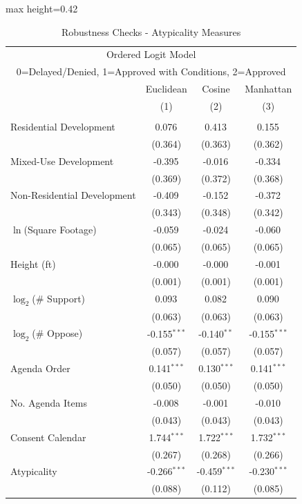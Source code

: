 \begin{table}[H]
\centering
\caption{Robustness Checks - Atypicality Measures}
\vspace{0.2cm}
\label{tab_atypicality_robustness}
\begin{adjustbox}{max height=0.42\textheight}
\begin{threeparttable}
\begin{tabular}{lccc}
\multicolumn{4}{c}{Ordered Logit Model} \\
\multicolumn{4}{c}{0=Delayed/Denied, 1=Approved with Conditions, 2=Approved} \\
\toprule
 & Euclidean & Cosine & Manhattan  \\
 & (1) & (2) & (3) \\
\midrule
 &  &  &  \\
Residential Development  & 0.076$^{}$ & 0.413$^{}$ & 0.155$^{}$ \\
 & (0.364) & (0.363) & (0.362) \\ [1.8ex]
Mixed-Use Development  & -0.395$^{}$ & -0.016$^{}$ & -0.334$^{}$ \\
 & (0.369) & (0.372) & (0.368) \\ [1.8ex]
Non-Residential Development  & -0.409$^{}$ & -0.152$^{}$ & -0.372$^{}$ \\
 & (0.343) & (0.348) & (0.342) \\ [1.8ex]
$\ln$(Square Footage)  & -0.059$^{}$ & -0.024$^{}$ & -0.060$^{}$ \\
 & (0.065) & (0.065) & (0.065) \\ [1.8ex]
Height (ft)  & -0.000$^{}$ & -0.000$^{}$ & -0.001$^{}$ \\
 & (0.001) & (0.001) & (0.001) \\ [1.8ex]
$\log_2$(\# Support)  & 0.093$^{}$ & 0.082$^{}$ & 0.090$^{}$ \\
 & (0.063) & (0.063) & (0.063) \\ [1.8ex]
$\log_2$(\# Oppose)  & -0.155$^{***}$ & -0.140$^{**}$ & -0.155$^{***}$ \\
 & (0.057) & (0.057) & (0.057) \\ [1.8ex]
Agenda Order  & 0.141$^{***}$ & 0.130$^{***}$ & 0.141$^{***}$ \\
 & (0.050) & (0.050) & (0.050) \\ [1.8ex]
No. Agenda Items  & -0.008$^{}$ & -0.001$^{}$ & -0.010$^{}$ \\
 & (0.043) & (0.043) & (0.043) \\ [1.8ex]
Consent Calendar  & 1.744$^{***}$ & 1.722$^{***}$ & 1.732$^{***}$ \\
 & (0.267) & (0.268) & (0.266) \\ [1.8ex]
Atypicality  & -0.266$^{***}$ & -0.459$^{***}$ & -0.230$^{***}$ \\
 & (0.088) & (0.112) & (0.085) \\ [1.8ex]


\end{tabular}
\end{threeparttable}
\end{adjustbox}
\end{table}
